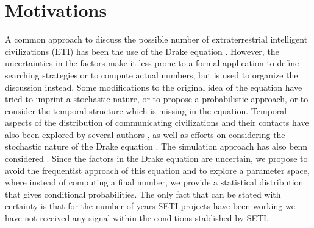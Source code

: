 \documentclass[crop]{CSLB}%
\begin{document}




\maketitle

\Fpagebreak


\section{Motivations}\label{S_motivations}

A common approach to discuss the possible number of extraterrestrial
intelligent civilizations (ETI) has been the use of the Drake equation
\citep{Gleiser2010, Prantzos2013, Haqq-Misra2017}.
%
However, the uncertainties in the factors make it less prone to a
formal application to define searching strategies or to compute
actual numbers, but is used to organize the discussion instead.
%
Some modifications to the original idea of the equation have tried to
imprint a stochastic nature, or to propose a probabilistic approach,
or to consider the temporal structure which is missing in the
equation.
%
Temporal aspects of the distribution of communicating civilizations
and their contacts have also been explored by several authors
\citep{Fogg1987, Forgan2011, Balbi2018},
%
as well as efforts on considering the stochastic nature of the Drake equation
\citep{Glade2011}.
%
The simulation approach has also benn considered
\citep{Forgan2008, Forgan2010}.
%
Since the factors in the Drake equation are uncertain, we propose to
avoid the frequentist approach of this equation
and to explore a parameter space, where instead of computing a final
number, we provide a statistical distribution that gives conditional
probabilities.
%
The only fact that can be stated with certainty is that for the number
of years SETI projects have been working we have not received any
signal within the conditions stablished by SETI.
\end{document}
